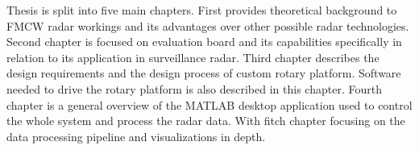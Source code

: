 Thesis is split into five main chapters.
First provides theoretical background to FMCW radar workings and its advantages over other possible radar technologies.
Second chapter is focused on \sidar evaluation board and its capabilities specifically in relation to its application in surveillance radar.
Third chapter describes the design requirements and the design process of custom rotary platform.
Software needed to drive the rotary platform is also described in this chapter.
Fourth chapter is a general overview of the MATLAB desktop application used to control the whole system and process the radar data.
With fitch chapter focusing on the data processing pipeline and visualizations in depth.
